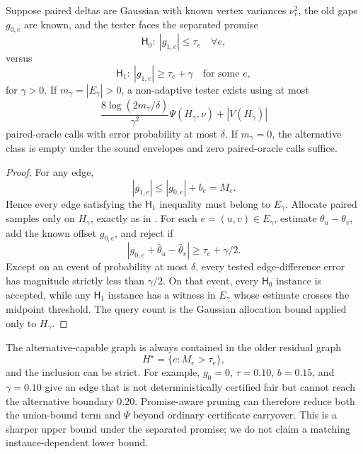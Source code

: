 \begin{corollary}
\label{cor:envelope-gaussian}
Suppose paired deltas are Gaussian with known vertex variances \(\nu_v^2\), the
old gaps \(g_{0,e}\) are known, and the tester faces the separated promise
\[
\mathsf H_0:\ |g_{1,e}|\le\tau_e\quad\forall e,
\]
versus
\[
\mathsf H_1:\ |g_{1,e}|\ge\tau_e+\gamma
\quad\text{for some }e,
\]
for \(\gamma>0\).  If \(m_\gamma=|E_\gamma|>0\), a non-adaptive tester exists
using at most
\[
\frac{8\log(2m_\gamma/\delta)}{\gamma^2}
\Psi(H_\gamma,\nu)
+
|V(H_\gamma)|
\]
paired-oracle calls with error probability at most \(\delta\).  If
\(m_\gamma=0\), the alternative class is empty under the sound envelopes and zero
paired-oracle calls suffice.
\end{corollary}

\begin{proof}
For any edge,
\[
|g_{1,e}|
\le
|g_{0,e}|+b_e
=
M_e.
\]
Hence every edge satisfying the \(\mathsf H_1\) inequality must belong to
\(E_\gamma\).  Allocate paired samples only on \(H_\gamma\), exactly as in
.  For each \(e=(u,v)\in E_\gamma\), estimate
\(\theta_u-\theta_v\), add the known offset \(g_{0,e}\), and reject if
\[
|g_{0,e}+\widehat\theta_u-\widehat\theta_v|
\ge
\tau_e+\gamma/2.
\]
Except on an event of probability at most \(\delta\), every tested edge-difference
error has magnitude strictly less than \(\gamma/2\).  On that event, every
\(\mathsf H_0\) instance is accepted, while any \(\mathsf H_1\) instance has a
witness in \(E_\gamma\) whose estimate crosses the midpoint threshold.  The query
count is the Gaussian allocation bound applied only to \(H_\gamma\).
\end{proof}

The alternative-capable graph is always contained in the older residual graph
\[
H^\star=\{e:M_e>\tau_e\},
\]
and the inclusion can be strict.  For example, \(g_0=0\), \(\tau=0.10\),
\(b=0.15\), and \(\gamma=0.10\) give an edge that is not deterministically
certified fair but cannot reach the alternative boundary \(0.20\).  Promise-aware
pruning can therefore reduce both the union-bound term and
\(\Psi\) beyond ordinary certificate carryover.  This is a sharper upper bound
under the separated promise; we do not claim a matching instance-dependent
lower bound.
